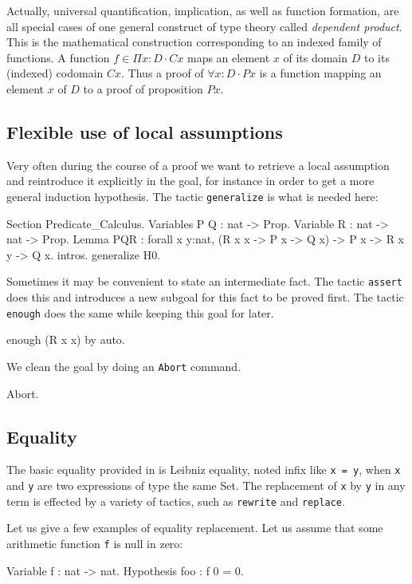 \documentclass[11pt,a4paper]{book}
\begin{document}
Actually, universal quantification, implication,
as well as function formation, are
all special cases of one general construct of type theory called
{\sl dependent product}. This is the mathematical construction
corresponding to an indexed family of functions. A function
$f\in \Pi x:D\cdot Cx$ maps an element $x$ of its domain $D$ to its
(indexed) codomain $Cx$. Thus a proof of $\forall x:D\cdot Px$ is
a function mapping an element $x$ of $D$ to a proof of proposition $Px$.


\subsection{Flexible use of local assumptions}

Very often during the course of a proof we want to retrieve a local
assumption and reintroduce it explicitly in the goal, for instance
in order to get a more general induction hypothesis. The tactic
\verb:generalize: is what is needed here:

\begin{coq_example}
Section Predicate_Calculus.
Variables P Q : nat -> Prop.
Variable R :  nat -> nat -> Prop.
Lemma PQR :
 forall x y:nat, (R x x -> P x -> Q x) -> P x -> R x y -> Q x.
intros.
generalize H0.
\end{coq_example}

Sometimes it may be convenient to state an intermediate fact.
The tactic \verb:assert: does this and introduces a new subgoal
for this fact to be proved first. The tactic \verb:enough: does
the same while keeping this goal for later.
\begin{coq_example}
enough (R x x) by auto.
\end{coq_example}
We clean the goal by doing an \verb:Abort: command.
\begin{coq_example*}
Abort.
\end{coq_example*}


\subsection{Equality}

The basic equality provided in \Coq{} is Leibniz equality, noted infix like
\texttt{x = y}, when \texttt{x} and \texttt{y} are two expressions of
type the same Set. The replacement of \texttt{x} by \texttt{y} in any
term is effected by a variety of tactics, such as \texttt{rewrite}
and \texttt{replace}.

Let us give a few examples of equality replacement. Let us assume that
some arithmetic function \verb:f: is null in zero:
\begin{coq_example}
Variable f : nat -> nat.
Hypothesis foo : f 0 = 0.
\end{coq_example}
\end{document}
